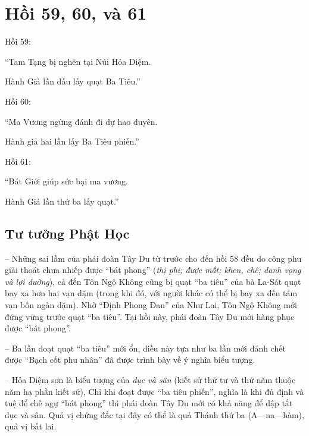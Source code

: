 \chapter{Hồi 59, 60, và 61} %
\label{cha:hoi_59_60}

Hồi 59:

\begin{itshape}
``Tam Tạng bị nghẽn tại Núi Hỏa Diệm.

Hành Giả lần đầu lấy quạt Ba Tiêu.''
\end{itshape}

Hồi 60:

\begin{itshape}
``Ma Vương ngừng đánh đi dự hao duyên.

Hành giả hai lần lấy Ba Tiêu phiến.''
\end{itshape}

Hồi 61:

\begin{itshape}
``Bát Giới giúp sức bại ma vương.

Hành Giả lần thứ ba lấy quạt.''
\end{itshape}

\section{Tư tưởng Phật Học} %
\label{sec:59_60_phat_hoc}

-- Những sai lầm của phái đoàn Tây Du từ trước cho đến hồi 58 đều do công phu giải thoát chưa nhiếp được ``bát phong'' (\emph{thị phi; được mất; khen, chê; danh vọng và lợi dưỡng}), cả đến Tôn Ngộ Không cũng bị quạt ``ba tiêu'' của bà La-Sát quạt bay xa hơn hai vạn dặm (trong khi đó, với người khác có thể bị bay xa đến tám vạn bốn ngàn dặm). Nhờ ``Định Phong Đan'' của Như Lai, Tôn Ngộ Không mới đứng vững trước quạt ``ba tiêu''. Tại hồi này, phái đoàn Tây Du mới hàng phục được ``bát phong''.

-- Ba lần đoạt quạt ``ba tiêu'' mới ổn, điều này tựa như ba lần mới đánh chết được ``Bạch cốt phu nhân'' đã được trình bày về ý nghĩa biểu tượng.

-- Hỏa Diệm sơn là biểu tượng của \emph{dục và sân} (kiết sử thứ tư và thứ năm thuộc năm hạ phần kiết sử), Chỉ khi đoạt được ``ba tiêu phiến'', nghĩa là khi đủ định và tuệ để chế ngự ``bát phong'' thì phái đoàn Tây Du mới có khả năng để dập tắt dục và sân. Quả vị chứng đắc tại đây có thể là quả Thánh thứ ba (A---na---hàm), quả vị bất lai.

